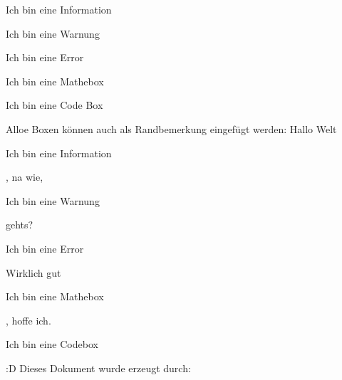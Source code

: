 \documentclass{book}
\begin{document}
\begin{infoBox}{Ich bin eine Information}
    \lipsum[2]
\end{infoBox}
\begin{warningBox}{Ich bin eine Warnung}
    \lipsum[2]
\end{warningBox}
\begin{errorBox}{Ich bin eine Error}
    \lipsum[2]
\end{errorBox}
\begin{mathBox}{Ich bin eine Mathebox}
    \lipsum[2]
\end{mathBox}
\begin{codeBox}{Ich bin eine Code Box}
    \lipsum[2]
\end{codeBox}
\clearpage
Alloe Boxen können auch als Randbemerkung eingefügt werden:
Hallo Welt\begin{infoBox*}{Ich bin eine Information}
    \lipsum[66]
\end{infoBox*}, na wie,\begin{warningBox*}{Ich bin eine Warnung}
    \lipsum[75]
\end{warningBox*} gehts?
\begin{errorBox*}{Ich bin eine Error}
    \lipsum[66]
\end{errorBox*}\lipsum[1-9]
Wirklich gut\begin{mathBox*}{Ich bin eine Mathebox}
    \lipsum[75]
\end{mathBox*}, hoffe ich.\lipsum[1-3]\begin{codeBox*}{Ich bin eine Codebox}
    \lipsum[66]
\end{codeBox*}:D
\lipsum[1-2]
\clearpage
{}
Dieses Dokument wurde erzeugt durch:
\end{document}
